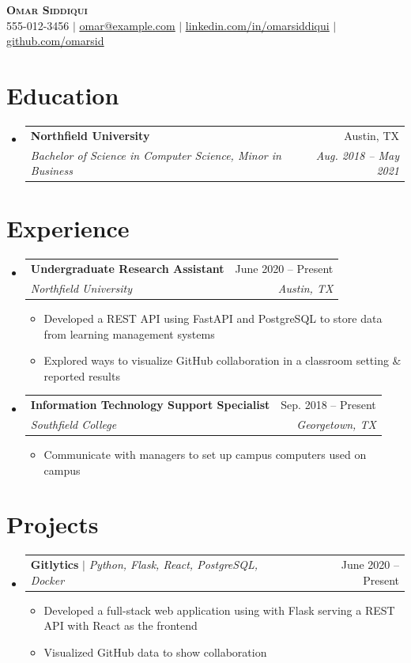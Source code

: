 \documentclass[letterpaper,11pt]{article}
\makeatletter
\newcommand{\resumeItem}[1]{
  \item\small{
    {#1 \vspace{-2pt}}
  }
}
\newcommand{\resumeSubheading}[4]{
  \vspace{-2pt}\item
    \begin{tabular*}{0.97\textwidth}[t]{l@{\extracolsep{\fill}}r}
      \textbf{#1} & #2 \\
      \textit{\small#3} & \textit{\small #4} \\
    \end{tabular*}\vspace{-7pt}
}
\newcommand{\resumeProjectHeading}[2]{
    \item
    \begin{tabular*}{0.97\textwidth}{l@{\extracolsep{\fill}}r}
      \small#1 & #2 \\
    \end{tabular*}\vspace{-7pt}
}
\newcommand{\resumeSubHeadingListStart}{\begin{itemize}[leftmargin=0.15in, label={}]}
\newcommand{\resumeSubHeadingListEnd}{\end{itemize}}
\newcommand{\resumeItemListStart}{\begin{itemize}}
\newcommand{\resumeItemListEnd}{\end{itemize}\vspace{-5pt}}
\makeatother
\begin{document}
\begin{center}
    \textbf{\Huge \scshape Omar Siddiqui} \\ \vspace{1pt}
    \small 555-012-3456 $|$ \href{mailto:omar@example.com}{\underline{omar@example.com}} $|$
    \href{https://linkedin.com/in/omarsiddiqui}{\underline{linkedin.com/in/omarsiddiqui}} $|$
    \href{https://github.com/omarsid}{\underline{github.com/omarsid}}
\end{center}

\section{Education}
  \resumeSubHeadingListStart
    \resumeSubheading
      {Northfield University}{Austin, TX}
      {Bachelor of Science in Computer Science, Minor in Business}{Aug. 2018 -- May 2021}
  \resumeSubHeadingListEnd

\section{Experience}
  \resumeSubHeadingListStart

    \resumeSubheading
      {Undergraduate Research Assistant}{June 2020 -- Present}
      {Northfield University}{Austin, TX}
      \resumeItemListStart
        \resumeItem{Developed a REST API using FastAPI and PostgreSQL to store data from learning management systems}
        \resumeItem{Explored ways to visualize GitHub collaboration in a classroom setting \& reported results}
      \resumeItemListEnd

    \resumeSubheading
      {Information Technology Support Specialist}{Sep. 2018 -- Present}
      {Southfield College}{Georgetown, TX}
      \resumeItemListStart
        \resumeItem{Communicate with managers to set up campus computers used on campus}
      \resumeItemListEnd

  \resumeSubHeadingListEnd

\section{Projects}
    \resumeSubHeadingListStart
      \resumeProjectHeading
          {\textbf{Gitlytics} $|$ \emph{Python, Flask, React, PostgreSQL, Docker}}{June 2020 -- Present}
          \resumeItemListStart
            \resumeItem{Developed a full-stack web application using with Flask serving a REST API with React as the frontend}
            \resumeItem{Visualized GitHub data to show collaboration}
          \resumeItemListEnd
    \resumeSubHeadingListEnd
\end{document}

